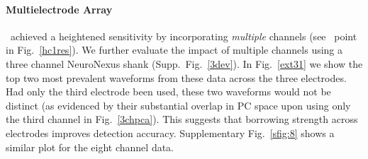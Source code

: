 \paragraph{Multielectrode Array} \label{sub:multi}


\smug\ achieved a heightened sensitivity by incorporating \emph{multiple} channels (see \smug\ point in Fig.\ \ref{hc1res}).  
We further evaluate the impact of multiple channels using a three channel NeuroNexus shank (Supp.\ Fig.\ \ref{3dev}). In Fig.\ \ref{ext31} we show the top two most prevalent waveforms from these data across the three electrodes.  Had only the third electrode been used, these two waveforms would not be distinct (as evidenced by their substantial overlap in PC space upon using only the third channel in Fig.\ \ref{3chpca}).  This suggests that borrowing strength across electrodes improves detection accuracy. Supplementary Fig.\ \ref{sfig:8} shows a similar plot for the eight channel data.  







